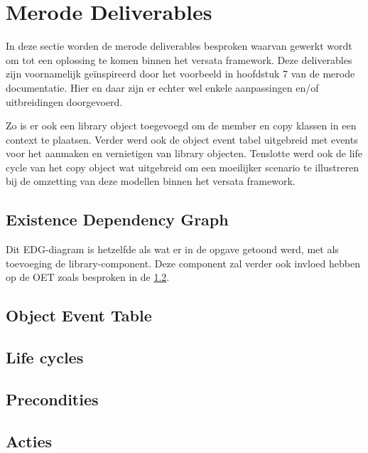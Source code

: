\section{Merode Deliverables}
In deze sectie worden de merode deliverables besproken waarvan gewerkt wordt om tot 
een oplossing te komen binnen het versata framework. Deze deliverables zijn voornamelijk
ge\"inspireerd door het voorbeeld in hoofdstuk 7 van de merode documentatie.
Hier en daar zijn er echter wel enkele aanpassingen en/of uitbreidingen doorgevoerd.

Zo is er ook een library object toegevoegd om de member en copy klassen in een context te plaatsen. Verder werd ook de object event tabel uitgebreid met events voor het aanmaken en vernietigen van library objecten. 
Tenslotte werd ook de life cycle van het copy object wat uitgebreid om een moeilijker scenario te illustreren bij de omzetting van deze modellen binnen het versata framework.
\subsection{Existence Dependency Graph}
Dit EDG-diagram is hetzelfde als wat er in de opgave getoond werd, met als toevoeging de
library-component. Deze component zal verder ook invloed hebben op de OET zoals besproken in de \ref{sec:oet}.
\subsection{Object Event Table}
\label{sec:oet}

\subsection{Life cycles}

\subsection{Precondities}
\subsection{Acties}

